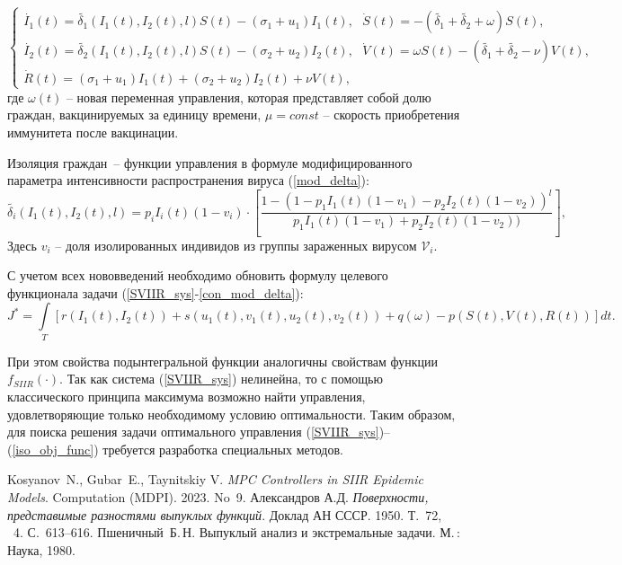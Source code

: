 \begin{equation}\label{SVIIR_sys}\tag{1*}
	\begin{cases}
        \dot{I_1}(t)=\widetilde{\delta_1}(I_1(t),I_2(t),l) S(t) - (\sigma_1 + u_1)I_1(t), 
        \ \ \
		\dot{S}(t)=-(\widetilde{\delta_1} + \widetilde{\delta_2} + \omega)S(t), \\
        \dot{I_2}(t)=\widetilde{\delta_2}(I_1(t),I_2(t),l) S(t) - (\sigma_2 + u_2)I_2(t),
        \ \ \
        \dot{V}(t)=\omega S(t) - (\widetilde{\delta_1} + \widetilde{\delta_2} - \nu)V(t), \\
        \dot{R}(t)=(\sigma_1+u_1) I_1(t)+(\sigma_2+u_2 )I_2(t) + \nu V(t),
	\end{cases}
\end{equation}
где $\omega(t)$ -- новая переменная управления, которая представляет собой долю граждан, вакцинируемых за единицу времени, $\mu = const$ -- скорость приобретения иммунитета после вакцинации.

Изоляция граждан~-- функции управления в формуле модифицированного параметра интенсивности распространения вируса (\ref{mod_delta}):
\begin{equation}\label{con_mod_delta} \tag{2*}
    \widetilde{\delta_i}(I_1(t),I_2(t),l) = p_i I_i(t) (1-v_i) \cdot \left[ \frac{1-(1 - p_1 I_1(t)(1-v_1) - p_2 I_2(t)(1-v_2))^l}{p_1 I_1(t)(1-v_1) + p_2 I_2(t)(1-v_2))} \right],
\end{equation}
Здесь $v_i$ -- доля изолированных индивидов из группы зараженных вирусом $\mathcal{V}_i$. 

С учетом всех нововведений необходимо обновить формулу целевого функционала задачи (\ref{SVIIR_sys}-\ref{con_mod_delta}):
\begin{equation}\label{iso_obj_func} \tag{3*}
    J^* = \int\limits_T \left[r(I_1(t),I_2(t)) + s(u_1(t),v_1(t),u_2(t),v_2(t)) + q(\omega) - p(S(t),V(t),R(t)) \right]dt.
\end{equation}

При этом свойства подынтегральной функции аналогичны свойствам функции $f_{SIIR}(\cdot)$. Так как система (\ref{SVIIR_sys}) нелинейна, то с помощью классического принципа максимума возможно найти управления, удовлетворяющие только необходимому условию оптимальности. Таким образом, для поиска решения задачи оптимального управления (\ref{SVIIR_sys})--(\ref{iso_obj_func}) требуется разработка специальных методов.

\begin{thebibliography}{99}
Kosyanov~N., Gubar~E., Taynitskiy V. {\it MPC Controllers in SIIR Epidemic Models}. Computation (MDPI). 2023. No~9.
\bibitem{alexan} Александров А.Д. {\it Поверхности, представимые разностями выпуклых функций}. Доклад АН СССР. 1950. Т.~72,  \textnumero~4. С.~613--616.
\bibitem{pshen}
Пшеничный~Б.\,Н. Выпуклый анализ и экстремальные задачи.  М.\,: Наука, 1980.
\end{thebibliography}



%

